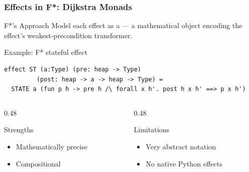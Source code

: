 \begin{frame}[fragile]
\frametitle{Effects in F*: Dijkstra Monads}
\begin{block}{F*'s Approach}
  Model each effect as a  --- a mathematical object
  encoding the effect's weakest-precondition transformer.
\end{block}
\vspace{8pt}
\begin{exampleblock}{Example: F* stateful effect}
\begin{lstlisting}
effect ST (a:Type) (pre: heap -> Type)
         (post: heap -> a -> heap -> Type) =
  STATE a (fun p h -> pre h /\ forall x h'. post h x h' ==> p x h')
\end{lstlisting}
\end{exampleblock}
\vspace{4pt}
\begin{columns}[T]
\begin{column}{0.48\textwidth}
\begin{exampleblock}{Strengths}
  \begin{itemize}
    \item Mathematically precise
    \item Compositional
  \end{itemize}
\end{exampleblock}
\end{column}
\begin{column}{0.48\textwidth}
\begin{alertblock}{Limitations}
  \begin{itemize}
    \item Very abstract notation
    \item No native Python effects
  \end{itemize}
\end{alertblock}
\end{column}
\end{columns}
\end{frame}

